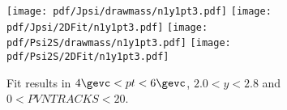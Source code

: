 \begin{figure}[H]
\begin{center}
\texttt{[image: pdf/Jpsi/drawmass/n1y1pt3.pdf]}
\texttt{[image: pdf/Jpsi/2DFit/n1y1pt3.pdf]}
\vspace*{-0.5cm}
\texttt{[image: pdf/Psi2S/drawmass/n1y1pt3.pdf]}
\texttt{[image: pdf/Psi2S/2DFit/n1y1pt3.pdf]}
\vspace*{-0.5cm}
\end{center}
\caption{Fit results in $4\gevc<pt<6\gevc$, $2.0<y<2.8$ and $0<PVNTRACKS<20$.}
\label{Fitn1y1pt3}
\end{figure}
